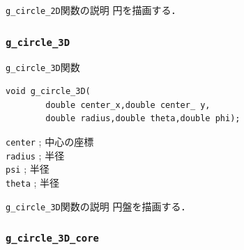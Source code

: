 \documentclass[a4paper,12pt]{jsarticle}%
\begin{document}
\begin{itembox}[l]{\texttt{g\_circle\_2D}関数の説明}
円を描画する．
\end{itembox}

\begin{figure}[htb]
\end{figure}


\clearpage
\subsubsection{\texttt{g\_circle\_3D}}

\begin{itembox}[l]{\texttt{g\_circle\_3D}関数}
\begin{verbatim}
void g_circle_3D(
        double center_x,double center_ y,
        double radius,double theta,double phi);
\end{verbatim}
\verb|center| ; 中心の座標\\
\verb|radius| ; 半径\\
\verb|psi| ; 半径\\
\verb|theta| ; 半径\\
\end{itembox}

\begin{itembox}[l]{\texttt{g\_circle\_3D}関数の説明}
円盤を描画する．
\end{itembox}






\clearpage
\subsubsection{\texttt{g\_circle\_3D\_core}}
\end{document}
